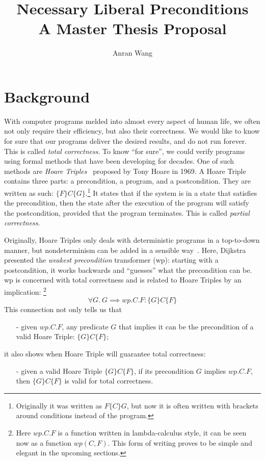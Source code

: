 \documentclass[adraft,hidelinks]{eptcs}
\begin{document}
\def\titlerunning{Proposal}
\def\authorrunning{Anran Wang}
\title{\Large Necessary Liberal Preconditions \\\normalsize A Master Thesis Proposal}
\author{Anran Wang}
\maketitle


%
\section*{Background}\label{sec:background}

With computer programs melded into almost every aspect of human life, we often not only require their efficiency, but also their correctness. 
We would like to know for sure that our programs deliver the desired results, and do not run forever. 
This is called \textit{total correctness}. 
To know ``for sure'', we could verify programs using formal methods that have been developing for decades. 
One of such methods are \textit{Hoare Triples}~\cite{Hoare1969} proposed by Tony Hoare in 1969. 
A Hoare Triple contains three parts: a precondition, a program, and a postcondition. 
They are written as such: $\{F\}C\{G\}$.\footnote{Originally it was written as $F \{C\} G$, but now it is often written with brackets around conditions instead of the program.} 
It states that if the system is in a state that satisfies the precondition, then the state after the execution of the program will satisfy the postcondition, provided that the program terminates.
This is called \textit{partial correctness}. 

Originally, Hoare Triples only deals with deterministic programs in a top-to-down manner, but nondeterminism can be added in a sensible way~\cite{Dijkstra1975}.
Here, Dijkstra presented the \textit{weakest precondition} transformer (wp): starting with a postcondition, it works backwards and ``guesses'' what the precondition can be. 
wp is concerned with total correctness and is related to Hoare Triples by an implication: 
\footnote{Here $wp.C.F$ is a function written in lambda-calculus style, it can be seen now as a function $wp(C,F)$. This form of writing proves to be simple and elegant in the upcoming sections.}
\[\forall G.\ G\implies wp.C.F: \{G\} C \{F\}\]
This connection not only tells us that 
\begin{itemize}
    \item[-] given $wp.C.F$, any predicate $G$ that implies it can be the precondition of a valid Hoare Triple: $\{G\} C \{F\}$; 
\end{itemize}
it also shows when Hoare Triple will guarantee total correctness: 
\begin{itemize}
    \item[-] given a valid Hoare Triple $\{G\} C \{F\}$, if its precondition $G$ implies $wp.C.F$, then $\{G\} C \{F\}$ is valid for total correctness. 
\end{itemize}
\end{document}
